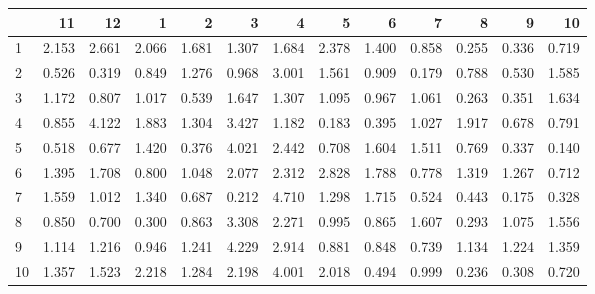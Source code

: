 \begin{tabular}{lrrrrrrrrrrrr}
\toprule
{} &     11 &     12 &     1  &     2  &     3  &     4  &     5  &     6  &     7  &     8  &     9  &     10 \\
\midrule
1  &  2.153 &  2.661 &  2.066 &  1.681 &  1.307 &  1.684 &  2.378 &  1.400 &  0.858 &  0.255 &  0.336 &  0.719 \\
2  &  0.526 &  0.319 &  0.849 &  1.276 &  0.968 &  3.001 &  1.561 &  0.909 &  0.179 &  0.788 &  0.530 &  1.585 \\
3  &  1.172 &  0.807 &  1.017 &  0.539 &  1.647 &  1.307 &  1.095 &  0.967 &  1.061 &  0.263 &  0.351 &  1.634 \\
4  &  0.855 &  4.122 &  1.883 &  1.304 &  3.427 &  1.182 &  0.183 &  0.395 &  1.027 &  1.917 &  0.678 &  0.791 \\
5  &  0.518 &  0.677 &  1.420 &  0.376 &  4.021 &  2.442 &  0.708 &  1.604 &  1.511 &  0.769 &  0.337 &  0.140 \\
6  &  1.395 &  1.708 &  0.800 &  1.048 &  2.077 &  2.312 &  2.828 &  1.788 &  0.778 &  1.319 &  1.267 &  0.712 \\
7  &  1.559 &  1.012 &  1.340 &  0.687 &  0.212 &  4.710 &  1.298 &  1.715 &  0.524 &  0.443 &  0.175 &  0.328 \\
8  &  0.850 &  0.700 &  0.300 &  0.863 &  3.308 &  2.271 &  0.995 &  0.865 &  1.607 &  0.293 &  1.075 &  1.556 \\
9  &  1.114 &  1.216 &  0.946 &  1.241 &  4.229 &  2.914 &  0.881 &  0.848 &  0.739 &  1.134 &  1.224 &  1.359 \\
10 &  1.357 &  1.523 &  2.218 &  1.284 &  2.198 &  4.001 &  2.018 &  0.494 &  0.999 &  0.236 &  0.308 &  0.720 \\
\bottomrule
\end{tabular}
